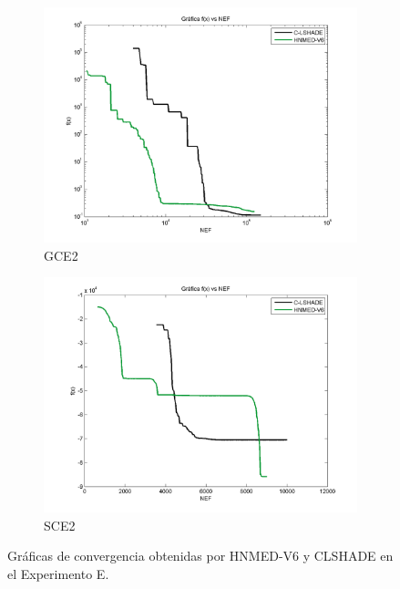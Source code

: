 \begin{figure}
\begin{subfigure}[b]{0.49\linewidth}
		\includegraphics[width=\linewidth]{Figures/F-Grafica_Convergencia_Problema_5}
		\caption{GCE2} \label{fig:G2} 
	\end{subfigure}
	\begin{subfigure}[b]{0.49\linewidth}
		\includegraphics[width=\linewidth]{Figures/F-Grafica_Convergencia_Problema_6}
		\caption{SCE2} \label{fig:S1} 
	\end{subfigure}
	\caption{Gráficas de convergencia obtenidas por HNMED-V6 y CLSHADE en el Experimento E.} \label{fig: Gráficas de convergencia obtenidas por HNMED-V6 y CLSHADE para el Experimento E.} 
	
\end{figure}


